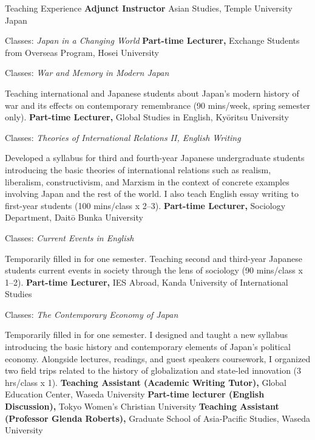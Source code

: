 \begin{rubric}{Teaching Experience}
 \entry*[2025/05 -- Present]%
	\textbf{Adjunct Instructor} Asian Studies, Temple University Japan
	\par Classes: \emph{Japan in a Changing World}
%
%
%
 \entry*[2024/04 -- Present]%
	\textbf{Part-time Lecturer,} Exchange Students from Overseas Program, Hosei University
        \par Classes: \emph{War and Memory in Modern Japan}
        \par \small Teaching international and Japanese students about Japan's modern history of war and its effects on contemporary remembrance (90 mins/week, spring semester only).
 \entry*[2024/09 -- Present]%
	\textbf{Part-time Lecturer,} Global Studies in English, Kyōritsu University
        \par Classes: \emph{Theories of International Relations II, English Writing}
        \par \small Developed a syllabus for third and fourth-year Japanese undergraduate students introducing the basic theories of international relations such as realism, liberalism, constructivism, and Marxism in the context of concrete examples involving Japan and the rest of the world. I also teach English essay writing to first-year students (100 mins/class x 2--3).
  \entry*[2024/09 -- 2025/3]%
	\textbf{Part-time Lecturer,} Sociology Department, Daitō Bunka University
        \par Classes: \emph{Current Events in English}
        \par \small Temporarily filled in for one semester. Teaching second and third-year Japanese students current events in society through the lens of sociology (90 mins/class x 1--2).
 \entry*[2024/09 -- 2024/12]%
	\textbf{Part-time Lecturer,} IES Abroad, Kanda University of International Studies
        \par Classes: \emph{The Contemporary Economy of Japan}
        \par \small Temporarily filled in for one semester. I designed and taught a new syllabus introducing the basic history and contemporary elements of Japan's political economy. Alongside lectures, readings, and guest speakers coursework, I organized two field trips related to the history of globalization and state-led innovation (3 hrs/class x 1).
\entry*[2019/09 -- 2025/02]%
	\textbf{Teaching Assistant (Academic Writing Tutor),} Global Education Center, Waseda University
%
%
%
 \entry*[2023/09 -- 2024/03]%
	\textbf{Part-time lecturer (English Discussion),} Tokyo Women's Christian University
\entry*[2023/04 -- 2024/03]%
	\textbf{Teaching Assistant (Professor Glenda Roberts),} Graduate School of Asia-Pacific Studies, Waseda University
\end{rubric}